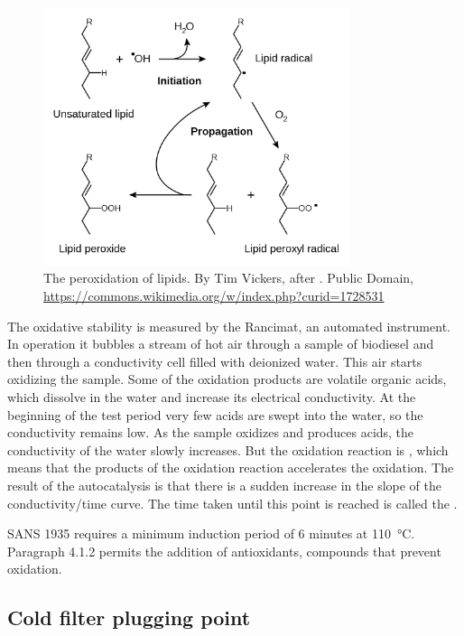\begin{figure}
\centering
\includegraphics[width=0.8\textwidth]{Figures/1281px-Lipid_peroxidation.png}
\decoRule

\caption[The peroxidation of lipids.]{The peroxidation of lipids. By Tim
Vickers, after \autocite{Young2001}. Public Domain,
\url{https://commons.wikimedia.org/w/index.php?curid=1728531}}

\label{fig:RancidRadical}
\end{figure}

The oxidative stability is measured by the Rancimat, an automated instrument. In
operation it bubbles a stream of hot air through a sample of biodiesel and then
through a conductivity cell filled with deionized water. This air starts
oxidizing the sample. Some of the oxidation products are volatile organic acids,
which dissolve in the water and increase its electrical conductivity. At the
beginning of the test period very few acids are swept into the water, so the
conductivity remains low. As the sample oxidizes and produces acids, the
conductivity of the water slowly increases. But the oxidation reaction is
, which means that the products of the oxidation reaction
accelerates the oxidation. The result of the autocatalysis is that there is a
sudden increase in the slope of the conductivity/time curve. The time taken
until this point is reached is called the .

SANS 1935 requires a minimum induction period of 6 minutes at
\SI{110}{\celsius}. Paragraph 4.1.2 permits the addition of antioxidants,
compounds that prevent oxidation.

\subsection{Cold filter plugging point}

